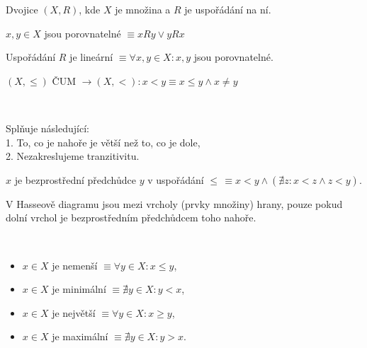 \documentclass[12pt]{article}					%
\begin{document}
    \begin{definice}
        Dvojice $(X, R)$, kde $X$ je množina a $R$ je uspořádání na ní.
    \end{definice}

    \begin{definice}
        $x, y \in X$ jsou porovnatelné $≡ xRy \lor yRx$

        Uspořádání $R$ je lineární $≡ \forall x,y \in X: x, y$ jsou porovnatelné.
    \end{definice}

    \begin{definice}
        $(X, ≤)$ ČUM $\rightarrow (X, <): x<y≡x≤y \land x≠y$
    \end{definice}

    \begin{definice}
        \ 
        \begin{poznamkain}
            Splňuje následující:\\
            1. To, co je nahoře je větší než to, co je dole,\\
            2. Nezakreslujeme tranzitivitu.
        \end{poznamkain}

        \begin{definicein}
            $x$ je bezprostřední předchůdce $y$ v uspořádání $≤\,≡ x<y \land (\nexists z: x<z \land z<y)$.
        \end{definicein}

        V Hasseově diagramu jsou mezi vrcholy (prvky množiny) hrany, pouze pokud dolní vrchol je bezprostředním předchůdcem toho nahoře.
    \end{definice}
    
    \begin{definice}
        \ 
        \begin{itemize}
            \item $x \in X$ je nemenší $≡ \forall y \in X: x≤y$,
            \item $x \in X$ je minimální $≡ \nexists y \in X: y<x$,
            \item $x \in X$ je největší $≡ \forall y \in X: x≥y$,
            \item $x \in X$ je maximální $≡ \nexists y \in X: y>x$.
        \end{itemize}
    \end{definice}
\end{document}
